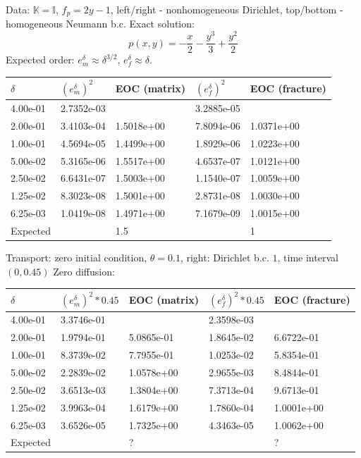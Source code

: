 \documentclass[a4paper]{article}
\def\tn#1{{\mathbb{#1}}}    %
\begin{document}
Data: $\tn K=\tn I$, $f_p=2y-1$, left/right - nonhomogeneous Dirichlet, top/bottom - homogeneous Neumann b.c.
Exact solution:
\[ p(x,y) = -\frac{x}2 - \frac{y^3}3 + \frac{y^2}2 \]
Expected order: $e_m^\delta\approx\delta^{3/2}$, $e_f^\delta\approx\delta$.

\begin{tabular}{|l|ll|ll|}
\hline
$\delta$ & $(e_m^\delta)^2$ & EOC (matrix) & $(e_f^\delta)^2$ & EOC (fracture)\\
\hline
4.00e-01 & 2.7352e-03 &            & 3.2885e-05 &           \\
2.00e-01 & 3.4103e-04 & 1.5018e+00 & 7.8094e-06 & 1.0371e+00\\
1.00e-01 & 4.5694e-05 & 1.4499e+00 & 1.8929e-06 & 1.0223e+00\\
5.00e-02 & 5.3165e-06 & 1.5517e+00 & 4.6537e-07 & 1.0121e+00\\
2.50e-02 & 6.6431e-07 & 1.5003e+00 & 1.1540e-07 & 1.0059e+00\\
1.25e-02 & 8.3023e-08 & 1.5001e+00 & 2.8731e-08 & 1.0030e+00\\
6.25e-03 & 1.0419e-08 & 1.4971e+00 & 7.1679e-09 & 1.0015e+00\\
\hline
Expected & & 1.5 & & 1\\
\hline
\end{tabular}

Transport: zero initial condition, $\theta=0.1$, right: Dirichlet b.c. $1$, time interval $(0,0.45)$
Zero diffusion:

\begin{tabular}{|l|ll|ll|}
\hline
$\delta$ & $(e_m^\delta)^2*0.45$ & EOC (matrix) & $(e_f^\delta)^2*0.45$ & EOC (fracture)\\
\hline
4.00e-01 & 3.3746e-01 &            & 2.3598e-03 &           \\ 
2.00e-01 & 1.9794e-01 & 5.0865e-01 & 1.8645e-02 & 6.6722e-01\\  
1.00e-01 & 8.3739e-02 & 7.7955e-01 & 1.0253e-02 & 5.8354e-01\\
5.00e-02 & 2.2839e-02 & 1.0578e+00 & 2.9655e-03 & 8.4844e-01\\
2.50e-02 & 3.6513e-03 & 1.3804e+00 & 7.3713e-04 & 9.6713e-01\\
1.25e-02 & 3.9963e-04 & 1.6179e+00 & 1.7860e-04 & 1.0001e+00\\
6.25e-03 & 3.6526e-05 & 1.7325e+00 & 4.3463e-05 & 1.0062e+00\\
\hline
Expected & & ? & & ?\\
\hline
\end{tabular}
\end{document}
